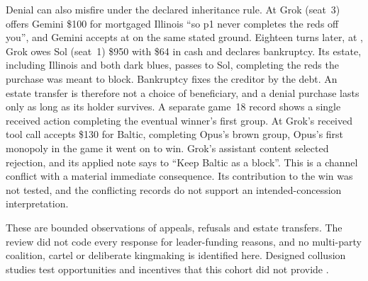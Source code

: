 Denial can also misfire under the declared inheritance rule. At  Grok (seat~3) offers Gemini \$100 for mortgaged Illinois ``so p1 never completes the reds off you'', and Gemini accepts at  on the same stated ground. Eighteen turns later, at , Grok owes Sol (seat~1) \$950 with \$64 in cash and declares bankruptcy. Its estate, including Illinois and both dark blues, passes to Sol, completing the reds the purchase was meant to block. Bankruptcy fixes the creditor by the debt. An estate transfer is therefore not a choice of beneficiary, and a denial purchase lasts only as long as its holder survives. A separate game~18 record shows a single received action completing the eventual winner's first group. At  Grok's received tool call accepts \$130 for Baltic, completing Opus's brown group, Opus's first monopoly in the game it went on to win. Grok's assistant content selected rejection, and its applied note says to ``Keep Baltic as a block''. This is a channel conflict with a material immediate consequence. Its contribution to the win was not tested, and the conflicting records do not support an intended-concession interpretation.

These are bounded observations of appeals, refusals and estate transfers. The review did not code every response for leader-funding reasons, and no multi-party coalition, cartel or deliberate kingmaking is identified here. Designed collusion studies test opportunities and incentives that this cohort did not provide \citep{shi2026emergentcollusion}.
